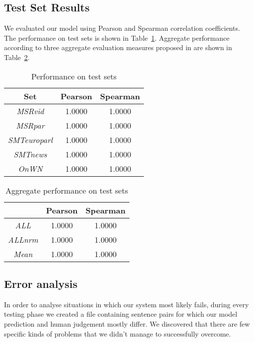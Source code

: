 \documentclass[10pt, a4paper]{article}
\begin{document}
\subsection{Test Set Results}

We evaluated our model using Pearson and Spearman correlation coefficients. The performance on test sets is shown in Table~\ref{tab:test-results-table}. Aggregate performance according to three aggregate evaluation measures proposed in \citep{agirre2012semeval} are shown in Table~\ref{tab:all-results-table}.

\begin{table}[h]
\caption{Performance on test sets}
\label{tab:test-results-table}
\begin{center}
\begin{tabular}{ccc}
\toprule
Set & Pearson & Spearman \\
\midrule
\textit{MSRvid} & 1.0000 & 1.0000 \\
\textit{MSRpar} & 1.0000 & 1.0000 \\
\textit{SMTeuroparl} & 1.0000 & 1.0000 \\
\textit{SMTnews} & 1.0000 & 1.0000 \\
\textit{OnWN} & 1.0000 & 1.0000 \\
\bottomrule
\end{tabular}
\end{center}
\end{table}

\begin{table}[h]
\caption{Aggregate performance on test sets}
\label{tab:all-results-table}
\begin{center}
\begin{tabular}{ccc}
\toprule
& Pearson & Spearman \\
\midrule
\textit{ALL} & 1.0000 & 1.0000 \\
\textit{ALLnrm} & 1.0000 & 1.0000 \\
\textit{Mean} & 1.0000 & 1.0000 \\
\bottomrule
\end{tabular}
\end{center}
\end{table}


\subsection{Error analysis}

In order to analyse situations in which our system most likely fails, during every testing phase we created a file containing sentence pairs for which our model prediction and human judgement mostly differ. We discovered that there are few specific kinds of problems that we didn't manage to successfully overcome.
\end{document}
